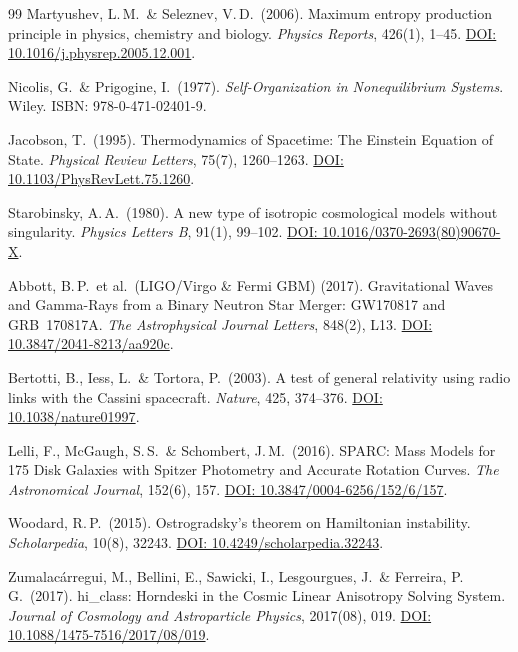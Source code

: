 \documentclass[aps,prd,twocolumn,superscriptaddress,nofootinbib]{revtex4-2}
\begin{document}
\begin{thebibliography}{99}
Martyushev, L.\,M.\ \& Seleznev, V.\,D.\ (2006).
Maximum entropy production principle in physics, chemistry and biology.
\textit{Physics Reports}, 426(1), 1--45.
\href{https://doi.org/10.1016/j.physrep.2005.12.001}{DOI: 10.1016/j.physrep.2005.12.001}.

Nicolis, G.\ \& Prigogine, I.\ (1977).
\textit{Self-Organization in Nonequilibrium Systems}. Wiley. ISBN: 978-0-471-02401-9.

Jacobson, T.\ (1995).
Thermodynamics of Spacetime: The Einstein Equation of State.
\textit{Physical Review Letters}, 75(7), 1260--1263.
\href{https://doi.org/10.1103/PhysRevLett.75.1260}{DOI: 10.1103/PhysRevLett.75.1260}.

Starobinsky, A.\,A.\ (1980).
A new type of isotropic cosmological models without singularity.
\textit{Physics Letters B}, 91(1), 99--102.
\href{https://doi.org/10.1016/0370-2693(80)90670-X}{DOI: 10.1016/0370-2693(80)90670-X}.

Abbott, B.\,P.\ et al.\ (LIGO/Virgo \& Fermi GBM) (2017).
Gravitational Waves and Gamma-Rays from a Binary Neutron Star Merger: GW170817 and GRB~170817A.
\textit{The Astrophysical Journal Letters}, 848(2), L13.
\href{https://doi.org/10.3847/2041-8213/aa920c}{DOI: 10.3847/2041-8213/aa920c}.

Bertotti, B., Iess, L.\ \& Tortora, P.\ (2003).
A test of general relativity using radio links with the Cassini spacecraft.
\textit{Nature}, 425, 374--376.
\href{https://doi.org/10.1038/nature01997}{DOI: 10.1038/nature01997}.

Lelli, F., McGaugh, S.\,S.\ \& Schombert, J.\,M.\ (2016).
SPARC: Mass Models for 175 Disk Galaxies with Spitzer Photometry and Accurate Rotation Curves.
\textit{The Astronomical Journal}, 152(6), 157.
\href{https://doi.org/10.3847/0004-6256/152/6/157}{DOI: 10.3847/0004-6256/152/6/157}.

Woodard, R.\,P.\ (2015).
Ostrogradsky's theorem on Hamiltonian instability.
\textit{Scholarpedia}, 10(8), 32243.
\href{https://doi.org/10.4249/scholarpedia.32243}{DOI: 10.4249/scholarpedia.32243}.

Zumalac\'arregui, M., Bellini, E., Sawicki, I., Lesgourgues, J.\ \& Ferreira, P.\,G.\ (2017).
hi\_class: Horndeski in the Cosmic Linear Anisotropy Solving System.
\textit{Journal of Cosmology and Astroparticle Physics}, 2017(08), 019.
\href{https://doi.org/10.1088/1475-7516/2017/08/019}{DOI: 10.1088/1475-7516/2017/08/019}.


\end{thebibliography}
\end{document}
